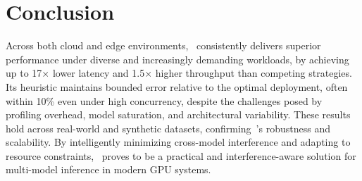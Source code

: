 \section{Conclusion}\label{sec:conclusion}

Across both cloud and edge environments,~\roomie{} consistently delivers superior performance under diverse and increasingly demanding workloads, by achieving up to 17× lower latency and 1.5× higher throughput than competing strategies. Its heuristic maintains bounded error relative to the optimal deployment, often within 10\% even under high concurrency, despite the challenges posed by profiling overhead, model saturation, and architectural variability. These results hold across real-world and synthetic datasets, confirming~\roomie{}'s robustness and scalability. By intelligently minimizing cross-model interference and adapting to resource constraints,~\roomie{} proves to be a practical and interference-aware solution for multi-model inference in modern GPU systems.